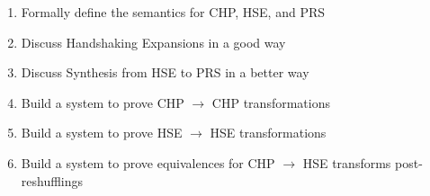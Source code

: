 \documentclass[times,10pt]{article}
\begin{document}
\begin{enumerate}

\item Formally define the semantics for CHP, HSE, and PRS

\item Discuss Handshaking Expansions in a good way 

\item Discuss Synthesis from HSE to PRS in a better way

\item Build a system to prove CHP $\rightarrow$ CHP transformations

\item Build a system to prove HSE $\rightarrow$ HSE transformations

\item Build a system to prove equivalences for CHP $\rightarrow$ HSE transforms post-reshufflings

\end{enumerate}
\end{document}
